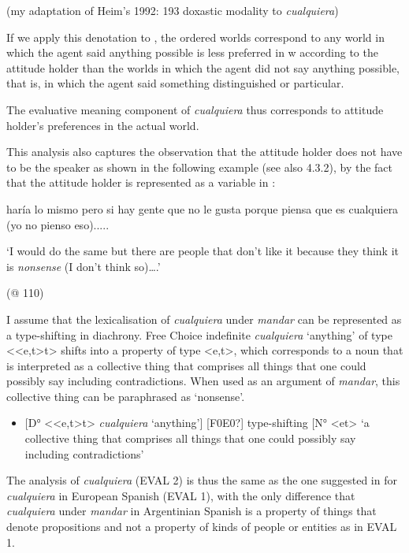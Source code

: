     (my adaptation of Heim’s 1992: 193 doxastic modality to \textit{cualquiera})

If we apply this denotation to , the ordered worlds correspond to any world in which the agent said anything possible is less preferred in w according to the attitude holder than the worlds in which the agent did not say anything possible, that is, in which the agent said something distinguished or particular.

  The evaluative meaning component of \textit{cualquiera} thus corresponds to attitude holder’s preferences in the actual world.

  This analysis also captures the observation that the attitude holder does not have to be the speaker as shown in the following example (see also 4.3.2), by the fact that the attitude holder is represented as a variable in :

    haría lo mismo pero si hay gente que no le gusta porque piensa que es cualquiera (yo no pienso eso).....

    ‘I would do the same but there are people that don’t like it because they think it is \textit{nonsense} (I don’t think so)….’

    (@ 110)

I assume that the lexicalisation of \textit{cualquiera} under \textit{mandar} can be represented as a type-shifting in diachrony. Free Choice indefinite \textit{cualquiera} ‘anything’ of type <<e,t>t> shifts into a property of type <e,t>, which corresponds to a noun that is interpreted as a collective thing that comprises all things that one could possibly say including contradictions. When used as an argument of \textit{mandar}, this collective thing can be paraphrased as ‘nonsense’.

\begin{itemize}
\item {[D° <<e,t>t>} {\textit{cualquiera}}{ ‘anything’] [F0E0?] type-shifting [N° <et> ‘a collective thing that comprises all things that one could possibly say including contradictions’}
\end{itemize}

The analysis of \textit{cualquiera} (EVAL 2) is thus the same as the one suggested in  for \textit{cualquiera} in European Spanish (EVAL 1), with the only difference that \textit{cualquiera} under \textit{mandar} in Argentinian Spanish is a property of things that denote propositions and not a property of kinds of people or entities as in EVAL 1.  

